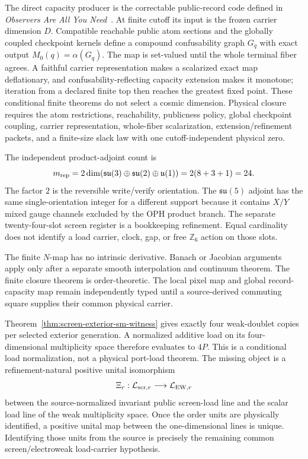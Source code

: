 \documentclass[11pt]{article}
\begin{document}
The direct capacity producer is the correctable public-record code defined in
\emph{Observers Are All You Need}~\cite{ophsynthesis}. At finite cutoff its
input is the frozen carrier dimension \(D\). Compatible reachable public atom
sections and the globally coupled checkpoint kernels define a compound
confusability graph \(G_q\) with exact output
\(M_0(q)=\alpha(G_q)\). The map is set-valued until the whole terminal fiber
agrees. A faithful carrier representation makes a scalarized exact map
deflationary, and confusability-reflecting capacity extension makes it monotone;
iteration from a declared finite top then reaches the greatest fixed point.
These conditional finite theorems do not select a cosmic dimension. Physical
closure requires the atom restrictions, reachability, publicness
policy, global checkpoint coupling, carrier representation, whole-fiber
scalarization, extension/refinement packets, and a finite-size slack law with
one cutoff-independent physical zero.

The independent product-adjoint count is
\[
m_{\rm rep}
=2\dim(\mathfrak{su}(3)\oplus\mathfrak{su}(2)\oplus\mathfrak u(1))
=2(8+3+1)
=24.
\]
The factor \(2\) is the reversible write/verify orientation. The \(\mathfrak{su}(5)\) adjoint
has the same single-orientation integer for a different support because it contains \(X/Y\)
mixed gauge channels excluded by the OPH product branch. The separate
twenty-four-slot screen register is a bookkeeping refinement. Equal
cardinality does not identify a load carrier, clock, gap, or free
\(\mathbb Z_6\) action on those slots.

The finite \(N\)-map has no intrinsic derivative. Banach or Jacobian arguments
apply only after a separate smooth interpolation and continuum theorem. The
finite closure theorem is order-theoretic. The local pixel map and global
record-capacity map remain independently typed until a source-derived
commuting square supplies their common physical carrier.

Theorem~\ref{thm:screen-exterior-sm-witness} gives exactly four weak-doublet
copies per selected exterior generation. A normalized additive load on its
four-dimensional multiplicity space therefore evaluates to \(4P\). This is a
conditional load normalization, not a physical port-load theorem. The missing
object is a refinement-natural positive unital isomorphism
\[
\Xi_r:\mathcal L_{{\rm scr},r}\longrightarrow
\mathcal L_{{\rm EW},r}
\]
between the source-normalized invariant public screen-load line and the scalar
load line of the weak multiplicity space. Once the order units are physically
identified, a positive unital map between the one-dimensional lines is unique.
Identifying those units from the source is precisely the remaining common
screen/electroweak load-carrier hypothesis.
\end{document}
